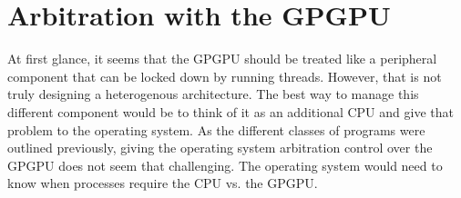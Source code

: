 \section*{Arbitration with the GPGPU}

At first glance, it seems that the GPGPU should be treated like a peripheral component that can be locked down by running threads. However, that is not truly designing a heterogenous architecture. The best way to manage this different component would be to think of it as an additional CPU and give that problem to the operating system. As the different classes of programs were outlined previously, giving the operating system arbitration control over the GPGPU does not seem that challenging. The operating system would need to know when processes require the CPU vs. the GPGPU. 









